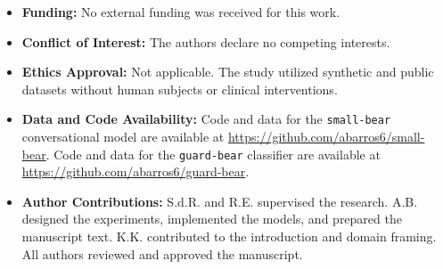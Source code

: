 \documentclass[pdflatex,sn-mathphys-num]{sn-jnl-official}%
\begin{document}
\begin{itemize}
\item \textbf{Funding:} No external funding was received for this work.
\item \textbf{Conflict of Interest:} The authors declare no competing interests.
\item \textbf{Ethics Approval:} Not applicable. The study utilized synthetic and public datasets without human subjects or clinical interventions.
\item \textbf{Data and Code Availability:} Code and data for the \texttt{small-bear} conversational model are available at \url{https://github.com/abarros6/small-bear}. Code and data for the \texttt{guard-bear} classifier are available at \url{https://github.com/abarros6/guard-bear}.
\item \textbf{Author Contributions:} S.d.R. and R.E. supervised the research. A.B. designed the experiments, implemented the models, and prepared the manuscript text. K.K. contributed to the introduction and domain framing. All authors reviewed and approved the manuscript.
\end{itemize}


\end{document}
